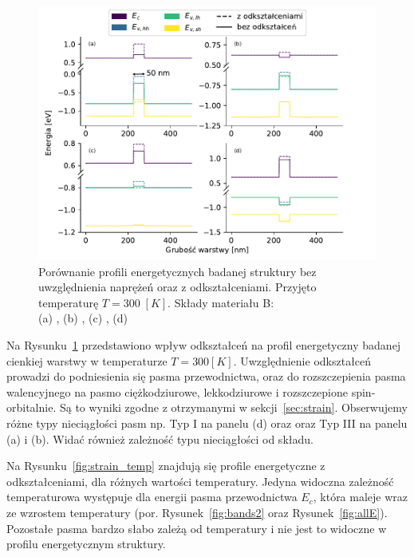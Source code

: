 \documentclass[12pt,openany,a4paper]{book}
\begin{document}
\begin{figure}[htbp]
	\centering
	\includegraphics[width = 1\linewidth]{Figures/structure/strain_no_strain.pdf}
	\caption{Porównanie profili energetycznych badanej struktury bez uwzględnienia
	naprężeń oraz z odkształceniami. Przyjęto temperaturę \(T = 300\;[K]\).
	Składy materiału B: \\(a) ,
	(b) , (c) ,
	(d) }\label{fig:strain_no_strain}
\end{figure}

Na Rysunku~\ref{fig:strain_no_strain} przedstawiono wpływ odkształceń na profil energetyczny
badanej cienkiej warstwy w temperaturze \(T = 300[K]\). Uwzględnienie odkształceń prowadzi do podniesienia się pasma przewodnictwa,
oraz do rozszczepienia pasma walencyjnego na pasmo ciężkodziurowe, lekkodziurowe i rozszczepione
spin-orbitalnie. Są to wyniki zgodne z otrzymanymi w sekcji~\ref{sec:strain}.
Obserwujemy różne typy nieciągłości pasm np. Typ I na panelu (d)
oraz oraz Typ III na panelu (a) i (b). Widać również zależność typu nieciągłości
od składu.

Na Rysunku~\ref{fig:strain_temp} znajdują się profile energetyczne z odkształceniami, dla
różnych wartości temperatury. Jedyna widoczna zależność temperaturowa występuje
dla energii pasma przewodnictwa \(E_c\), która maleje wraz ze wzrostem
temperatury (por. Rysunek~\ref{fig:bands2} oraz Rysunek~\ref{fig:allE}). Pozostałe
pasma bardzo słabo zależą od temperatury i nie jest to widoczne w profilu energetycznym
struktury.
\end{document}
